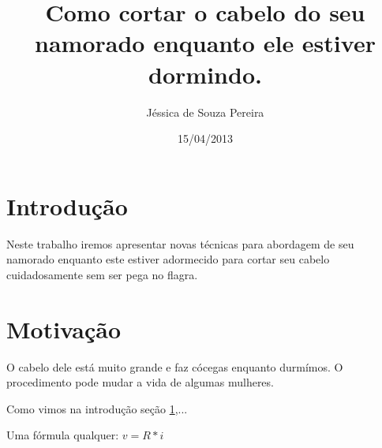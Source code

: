 \documentclass{article}
\author{Jéssica de Souza Pereira}
\date{15/04/2013}
\title{Como cortar o cabelo do seu namorado enquanto ele estiver dormindo.}
\begin{document}
\maketitle
\newpage
\section{Introdução}
\label{sec:intro}
Neste trabalho iremos apresentar novas técnicas para abordagem de seu namorado enquanto este estiver adormecido para cortar seu cabelo cuidadosamente sem ser pega no flagra.
\section{Motivação}
\label{sec:motiv}
O cabelo dele está muito grande e faz cócegas enquanto durmímos. O procedimento pode mudar a vida de algumas mulheres.

Como vimos na introdução {seção \ref{sec:intro}},...

Uma fórmula qualquer: $v=R*i$
\end{document}

